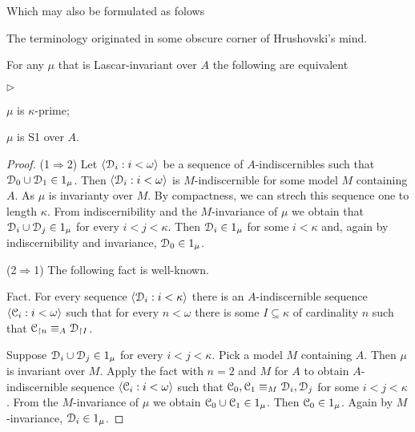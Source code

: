 \documentclass{amsproc}
\newcommand{\mylabel}[1]{{#1}\hfill}
\renewenvironment{itemize}
  {\begin{list}{$\triangleright$}{%
  \setlength{\parskip}{0mm}
  \setlength{\topsep}{.4\baselineskip}
  \setlength{\rightmargin}{0mm}
  \setlength{\listparindent}{0mm}
  \setlength{\itemindent}{0mm}
  \setlength{\labelwidth}{3ex}
  \setlength{\itemsep}{.2\baselineskip}
  \setlength{\parsep}{.2\baselineskip}
  \setlength{\partopsep}{0mm}
  \setlength{\labelsep}{1ex}
  \setlength{\leftmargin}{\labelwidth+\labelsep}
  \let\makelabel\mylabel}}{%
\end{list}}
\begin{document}
{}

Which may also be formulated as folows

{}

The terminology originated in some obscure corner of Hrushovski's mind.

\begin{fact}
  For any $\mu$ that is Lascar-invariant over $A$ the following are equivalent
  \begin{itemize}
    \item[1.] $\mu$ is $\kappa$-prime;
    \item[2.] $\mu$ is S1 over $A$.
  \end{itemize}
\end{fact}

\begin{proof}
  (1$\Rightarrow$2)  Let $\langle\EuScript D_i:i<\omega\rangle$ be a sequence of $A$-indiscernibles such that $\EuScript D_0\cup\EuScript D_1\in1_\mu$.
  Then $\langle\EuScript D_i:i<\omega\rangle$ is $M$-indiscernible for some model $M$ containing $A$.
  As $\mu$ is invarianty over $M$. 
  By compactness, we can strech this sequence one to length $\kappa$.
  From indiscernibility and the $M$-invariance of $\mu$ we obtain that $\EuScript D_i\cup\EuScript D_j\in1_\mu$ for every $i<j<\kappa$.
  Then $\EuScript D_i\in1_\mu$ for some $i<\kappa$ and, again by indiscernibility and invariance, $\EuScript D_0\in1_\mu$.

  (2$\Rightarrow$1)
  The following fact is well-known.
  
  Fact.
  For every sequence $\langle\EuScript D_i:i<\kappa\rangle$ there is an $A$-indiscernible sequence $\langle\EuScript C_i:i<\omega\rangle$ such that for every $n<\omega$ there is some $I\subseteq\kappa$ of cardinality $n$ such that $\EuScript C_{\restriction n}\equiv_A\EuScript D_{\restriction I}$.

  Suppose $\EuScript D_i\cup \EuScript D_j\in1_\mu$ for every $i<j<\kappa$.
  Pick a model $M$ containing $A$.
  Then $\mu$ is invariant over $M$.
  Apply the fact with $n=2$ and $M$ for $A$ to obtain $A$-indiscer\-nible sequence $\langle\EuScript C_i:i<\omega\rangle$ such that $\EuScript C_0,\EuScript C_1\equiv_M\EuScript D_i,\EuScript D_j$ for some $i<j<\kappa$.
  From the $M$-invariance of $\mu$ we obtain $\EuScript C_0\cup \EuScript C_1\in1_\mu$.
  Then $\EuScript C_0\in1_\mu$.
  Again by $M$-invariance, $\EuScript D_i\in1_\mu$.
\end{proof}
\end{document}
